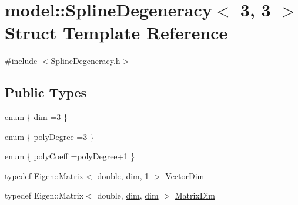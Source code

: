 \hypertarget{structmodel_1_1_spline_degeneracy_3_013_00_013_01_4}{}\section{model\+:\+:Spline\+Degeneracy$<$ 3, 3 $>$ Struct Template Reference}
\label{structmodel_1_1_spline_degeneracy_3_013_00_013_01_4}


{\ttfamily \#include $<$Spline\+Degeneracy.\+h$>$}

\subsection*{Public Types}
\begin{DoxyCompactItemize}
\item 
enum \{ \hyperlink{structmodel_1_1_spline_degeneracy_3_013_00_013_01_4_a3572507efca566685b67cf5412b870c6a56bf1ade339b58476d01e9aa1dc7a292}{dim} =3
 \}
\item 
enum \{ \hyperlink{structmodel_1_1_spline_degeneracy_3_013_00_013_01_4_a017fabbe09d7d99d8debf7445fe21eddaca6ff5c9f04c686b017efc4d587c6da2}{poly\+Degree} =3
 \}
\item 
enum \{ \hyperlink{structmodel_1_1_spline_degeneracy_3_013_00_013_01_4_a67aec3b68581303ee6db8cbafe79b983a5604efb1d99abff2a208ea3a83bc2699}{poly\+Coeff} =poly\+Degree+1
 \}
\item 
typedef Eigen\+::\+Matrix$<$ double, \hyperlink{structmodel_1_1_spline_degeneracy_3_013_00_013_01_4_a3572507efca566685b67cf5412b870c6a56bf1ade339b58476d01e9aa1dc7a292}{dim}, 1 $>$ \hyperlink{structmodel_1_1_spline_degeneracy_3_013_00_013_01_4_a58d2053b56b3f1a8cce4c07098c0039a}{Vector\+Dim}
\item 
typedef Eigen\+::\+Matrix$<$ double, \hyperlink{structmodel_1_1_spline_degeneracy_3_013_00_013_01_4_a3572507efca566685b67cf5412b870c6a56bf1ade339b58476d01e9aa1dc7a292}{dim}, \hyperlink{structmodel_1_1_spline_degeneracy_3_013_00_013_01_4_a3572507efca566685b67cf5412b870c6a56bf1ade339b58476d01e9aa1dc7a292}{dim} $>$ \hyperlink{structmodel_1_1_spline_degeneracy_3_013_00_013_01_4_a016b56948871fb7d1c223f8ccb6b9f70}{Matrix\+Dim}
\end{DoxyCompactItemize}
